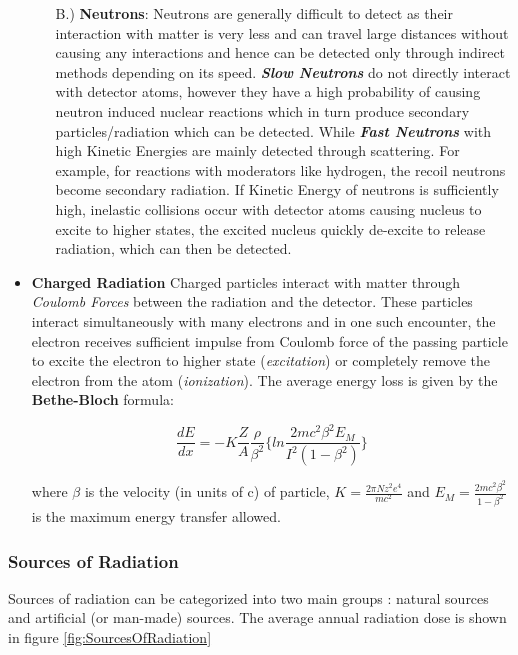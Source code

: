 \documentclass[../introduction.tex]{subfiles}
\begin{document}
\begin{itemize}
\begin{enumerate}
            \item[B.)] \textbf{Neutrons}: Neutrons are generally difficult to detect as their interaction with matter 
            is very less and can travel large distances without causing any interactions and hence can be detected only 
            through indirect methods depending on its speed. \textbf{\textit{Slow Neutrons }} do not directly interact with 
            detector atoms, however they have a high probability of causing neutron induced nuclear reactions which in turn 
            produce secondary particles/radiation which can be detected. While \textbf{\textit{Fast Neutrons} } with high 
            Kinetic Energies are mainly detected through scattering. For example, for reactions with moderators like hydrogen, 
            the recoil neutrons become secondary radiation. If Kinetic Energy of neutrons is sufficiently high, 
            inelastic collisions occur with detector atoms causing nucleus to excite to higher states, the excited nucleus 
            quickly de-excite to release radiation, which can then be detected. 
        \end{enumerate}

        \item \textbf{Charged Radiation} Charged particles interact with matter through \textit{Coulomb Forces} 
        between the radiation and the detector. These particles interact simultaneously with many electrons and in one 
        such encounter, the electron receives sufficient impulse from Coulomb force of the passing particle to excite 
        the electron to higher state (\textit{excitation}) or completely remove the electron from the atom 	
        (\textit{ionization}). The average energy loss is given by the \textbf{Bethe-Bloch}\cite{t1} formula:

        $$\frac{dE}{dx}=-K\frac{Z}{A}\frac{\rho}{\beta^2}\{ln\frac{2mc^2\beta^2E_M}{I^2(1-\beta^2)}\}$$

        where $\beta$ is the velocity (in units of c) of particle, 
        $K=\frac{2\pi Nz^2e^4}{mc^2}$ and $E_M=\frac{2mc^2\beta^2}{1-\beta^2}$ is the maximum energy transfer allowed.
        
    \end{itemize}
    
    \subsubsection*{\large Sources of Radiation}
        Sources of radiation can be categorized into two main groups \cite{u5}: natural sources and artificial (or man-made) sources. 
        The average annual radiation dose is shown in figure \ref{fig:SourcesOfRadiation}
\end{document}

